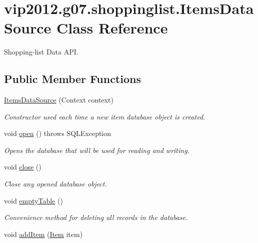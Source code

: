 \hypertarget{classvip2012_1_1g07_1_1shoppinglist_1_1ItemsDataSource}{\section{vip2012.\-g07.\-shoppinglist.\-Items\-Data\-Source Class Reference}
\label{classvip2012_1_1g07_1_1shoppinglist_1_1ItemsDataSource}
}


Shopping-\/list Data A\-P\-I.  


\subsection*{Public Member Functions}
\begin{DoxyCompactItemize}
\item 
\hyperlink{classvip2012_1_1g07_1_1shoppinglist_1_1ItemsDataSource_a7f587b5659f28abccaa29599d1929b0e}{Items\-Data\-Source} (Context context)
\begin{DoxyCompactList}\small\item\em Constructor used each time a new item database object is created. \end{DoxyCompactList}\item 
void \hyperlink{classvip2012_1_1g07_1_1shoppinglist_1_1ItemsDataSource_a112f0fe334be82e8ea9c007bbda43a9b}{open} ()  throws S\-Q\-L\-Exception 
\begin{DoxyCompactList}\small\item\em Opens the database that will be used for reading and writing. \end{DoxyCompactList}\item 
void \hyperlink{classvip2012_1_1g07_1_1shoppinglist_1_1ItemsDataSource_a1ce40231e9a340d63593060a7669054d}{close} ()
\begin{DoxyCompactList}\small\item\em Close any opened database object. \end{DoxyCompactList}\item 
void \hyperlink{classvip2012_1_1g07_1_1shoppinglist_1_1ItemsDataSource_a46a373cfb826d1276d1466b4179ad87e}{empty\-Table} ()
\begin{DoxyCompactList}\small\item\em Convenience method for deleting all records in the database. \end{DoxyCompactList}\item 
void \hyperlink{classvip2012_1_1g07_1_1shoppinglist_1_1ItemsDataSource_a6e314e4ad98c8084515bd1f8835100d6}{add\-Item} (\hyperlink{classvip2012_1_1g07_1_1shoppinglist_1_1Item}{Item} item)

\end{DoxyCompactItemize}
